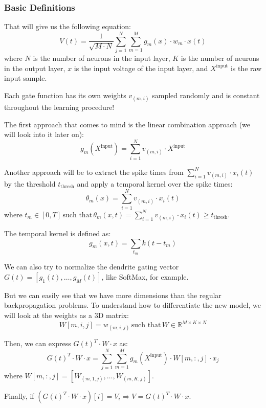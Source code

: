 \subsubsection{Basic Definitions}

That will give us the following equation:
\begin{equation}
V(t) = \frac{1}{\sqrt{M \cdot N}} \sum_{j=1}^{N} \sum_{m=1}^{M} g_m (x) \cdot w_m \cdot x(t)
\end{equation}
where $N$ is the number of neurons in the input layer, $K$ is the number of neurons in the output layer, $x$ is the input voltage of the input layer, and $X^\text{input}$ is the raw input sample.

Each gate function has its own weights $v_{(m,i)}$ sampled randomly and is constant throughout the learning procedure!

The first approach that comes to mind is the linear combination approach (we will look into it later on):
\begin{equation}
g_m (X^\text{input}) = \sum_{i=1}^{N} v_{(m,i)} \cdot X^\text{input}
\end{equation}

Another approach will be to extract the spike times from $\sum_{i=1}^{N} v_{(m,i)} \cdot x_i (t)$ by the threshold $t_\text{thresh}$ and apply a temporal kernel over the spike times:
\begin{equation}
\theta_m (x) = \sum_{i=1}^{N} v_{(m,i)} \cdot x_i (t)
\end{equation}
where $t_m \in [0,T] \, \text{such that} \, \theta_m (x,t) = \sum_{i=1}^{N} v_{(m,i)} \cdot x_i (t) \geq t_\text{thresh}$.

The temporal kernel is defined as:
\begin{equation}
g_m (x,t) = \sum_{t_m} k(t - t_m)
\end{equation}

We can also try to normalize the dendrite gating vector $G(t) = [g_1 (t), \ldots, g_M (t)]$, like SoftMax, for example.

But we can easily see that we have more dimensions than the regular backpropagation problems. To understand how to differentiate the new model, we will look at the weights as a 3D matrix:
\begin{equation}
W[m,i,j] = w_{(m,i,j)} \, \text{such that} \, W \in \mathbb{R}^{M \times K \times N}
\end{equation}

Then, we can express $G(t)^T \cdot W \cdot x$ as:
\begin{equation}
G(t)^T \cdot W \cdot x = \sum_{j=1}^{N} \sum_{m=1}^{M} g_m (X^\text{input}) \cdot W[m,:,j] \cdot x_j
\end{equation}
where $W[m,:,j] = [W_{(m,1,j)}, \ldots, W_{(m,K,j)}]$.

Finally, if $(G(t)^T \cdot W \cdot x)[i] = V_i \Rightarrow V = G(t)^T \cdot W \cdot x$.
